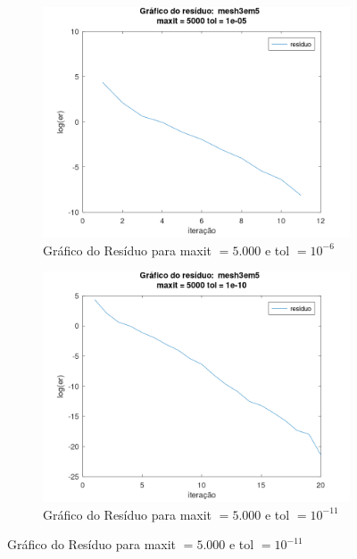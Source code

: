 \begin{figure}[H]
    \centering
    \begin{subfigure}[t]{0.36\linewidth}
         \centering
         \includegraphics[width=\textwidth]{image/mesh3em5_5000_-6.png}
         \caption{Gráfico do Resíduo para maxit $= 5.000$ e tol $=10^{-6}$}
         \label{fig:mesh-5-6}
    \end{subfigure}
    \quad
    \begin{subfigure}[t]{0.36\linewidth}
         \centering
         \includegraphics[width=\textwidth]{image/mesh3em5_5000_-11.png}
         \caption{Gráfico do Resíduo para maxit $= 5.000$ e tol $=10^{-11}$}
         \label{fig:mesh-5-11}
    \end{subfigure}

\end{figure}
